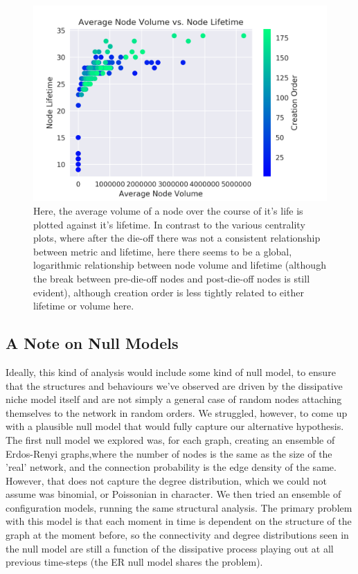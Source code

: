 \documentclass{paper}
\begin{document}
	\begin{figure}[h]
		\centering
		\includegraphics[scale=0.75]{volume_lifetimes.png}
		\caption{Here, the average volume of a node over the course of it's life is plotted against it's lifetime. In contrast to the various centrality plots, where after the die-off there was not a consistent relationship between metric and lifetime, here there seems to be a global, logarithmic relationship between node volume and lifetime (although the break between pre-die-off nodes and post-die-off nodes is still evident), although creation order is less tightly related to either lifetime or volume here.} 
		\label{volume-lifetime}
	\end{figure}
	
	
	\subsection{A Note on Null Models}
	Ideally, this kind of analysis would include some kind of null model, to ensure that the structures and behaviours we've observed are driven by the dissipative niche model itself and are not simply a general case of random nodes attaching themselves to the network in random orders. We struggled, however, to come up with a plausible null model that would fully capture our alternative hypothesis. The first null model we explored was, for each graph, creating an ensemble of Erdos-Renyi graphs,where the number of nodes is the same as the size of the 'real' network, and the connection probability is the edge density of the same. However, that does not capture the degree distribution, which we could not assume was binomial, or Poissonian in character. We then tried an ensemble of configuration models, running the same structural analysis. The primary problem with this model is that each moment in time is dependent on the structure of the graph at the moment before, so the connectivity and degree distributions seen in the null model are still a function of the dissipative process playing out at all previous time-steps (the ER null model shares the problem). 
	
\end{document}
